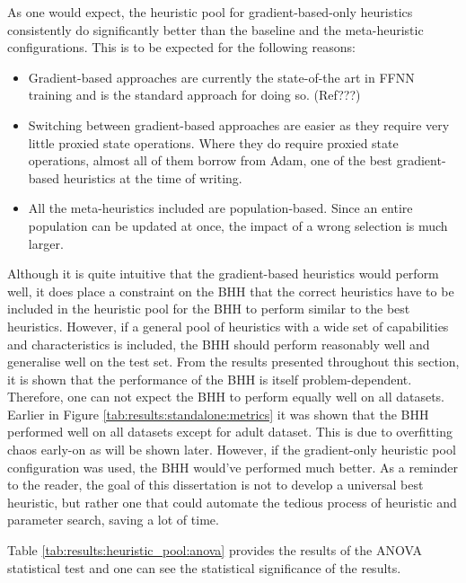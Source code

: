 As one would expect, the heuristic pool for gradient-based-only heuristics consistently do significantly better than the baseline and the meta-heuristic configurations. This is to be expected for the following reasons:

\begin{itemize}
	\item Gradient-based approaches are currently the state-of-the art in \Ac{FFNN} training and is the standard approach for doing so. (Ref???)

	\item Switching between gradient-based approaches are easier as they require very little proxied state operations. Where they do require proxied state operations, almost all of them borrow from \Ac{Adam}, one of the best gradient-based heuristics at the time of writing.

	\item All the meta-heuristics included are population-based. Since an entire population can be updated at once, the impact of a wrong selection is much larger.
\end{itemize}

Although it is quite intuitive that the gradient-based heuristics would perform well, it does place a constraint on the \Ac{BHH} that the correct heuristics have to be included in the heuristic pool for the \Ac{BHH} to perform similar to the best heuristics. However, if a general pool of heuristics with a wide set of capabilities and characteristics is included, the \Ac{BHH} should perform reasonably well and generalise well on the test set. From the results presented throughout this section, it is shown that the performance of the \Ac{BHH} is itself problem-dependent. Therefore, one can not expect the \Ac{BHH} to perform equally well on all datasets. Earlier in Figure \ref{tab:results:standalone:metrics} it was shown that the \Ac{BHH} performed well on all datasets except for adult dataset. This is due to overfitting chaos early-on as will be shown later. However, if the gradient-only heuristic pool configuration was used, the \Ac{BHH} would've performed much better. As a reminder to the reader, the goal of this dissertation is not to develop a universal best heuristic, but rather one that could automate the tedious process of heuristic and parameter search, saving a lot of time.

Table \ref{tab:results:heuristic_pool:anova} provides the results of the ANOVA statistical test and one can see the statistical significance of the results.

